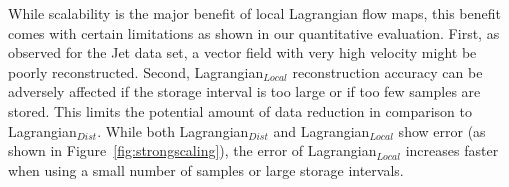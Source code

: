 While scalability is the major benefit of local Lagrangian flow maps, this benefit comes with certain limitations as shown in our quantitative evaluation.
%
First, as observed for the Jet data set, a vector field with very high velocity might be poorly reconstructed.
%
%
Second, Lagrangian$_{Local}$ reconstruction accuracy can be adversely affected if the storage interval is too large or if too few samples are stored.
%
This limits the potential amount of data reduction in comparison to Lagrangian$_{Dist}$.
%
%
%
%
%
While both Lagrangian$_{Dist}$ and Lagrangian$_{Local}$ show error (as shown in Figure~\ref{fig:strongscaling}), the error of Lagrangian$_{Local}$ increases faster when using a small number of samples or large storage intervals.
%

